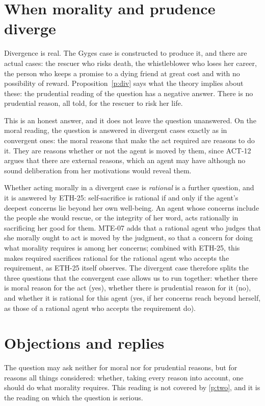 \documentclass{situationist-preprint}
\begin{document}
\section{When morality and prudence diverge}\label{s:div}

Divergence is real. The Gyges case is constructed to produce it, and there are actual cases: the rescuer who risks death, the whistleblower who loses her career, the person who keeps a promise to a dying friend at great cost and with no possibility of reward. Proposition~\ref{p:div} says what the theory implies about these: the prudential reading of the question has a negative answer. There is no prudential reason, all told, for the rescuer to risk her life.

This is an honest answer, and it does not leave the question unanswered. On the moral reading, the question is answered in divergent cases exactly as in convergent ones: the moral reasons that make the act required are reasons to do it. They are reasons whether or not the agent is moved by them, since ACT-12 argues that there are external reasons, which an agent may have although no sound deliberation from her motivations would reveal them.

Whether acting morally in a divergent case is \emph{rational} is a further question, and it is answered by ETH-25: self-sacrifice is rational if and only if the agent's deepest concerns lie beyond her own well-being. An agent whose concerns include the people she would rescue, or the integrity of her word, acts rationally in sacrificing her good for them. MTE-07 adds that a rational agent who judges that she morally ought to act is moved by the judgment, so that a concern for doing what morality requires is among her concerns; combined with ETH-25, this makes required sacrifices rational for the rational agent who accepts the requirement, as ETH-25 itself observes. The divergent case therefore splits the three questions that the convergent case allows us to run together: whether there is moral reason for the act (yes), whether there is prudential reason for it (no), and whether it is rational for this agent (yes, if her concerns reach beyond herself, as those of a rational agent who accepts the requirement do).

\section{Objections and replies}

\begin{objection}\label{o:third}
The question may ask neither for moral nor for prudential reasons, but for reasons all things considered: whether, taking every reason into account, one should do what morality requires. This reading is not covered by \ref{p:two}, and it is the reading on which the question is serious.
\end{objection}
\end{document}
